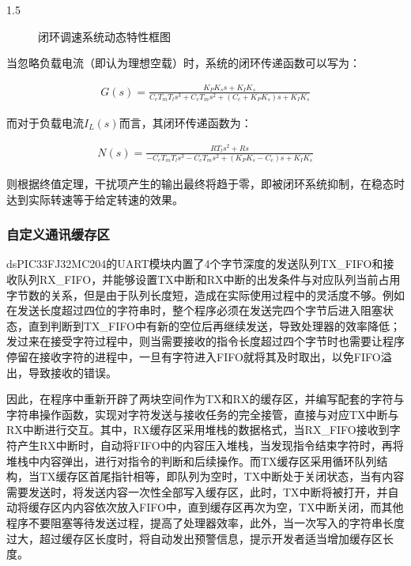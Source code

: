 \documentclass[a4paper,11pt]{ctexart}
\newcommand{\dsp}{dsPIC33FJ32MC204}
\newenvironment{shrinkeq}[2]
{
	\bgroup
	\addtolength\abovedisplayshortskip{#1}
	\addtolength\abovedisplayskip{#1}
	\addtolength\belowdisplayshortskip{#2}
	\addtolength\belowdisplayskip{#2}
}
{
	\egroup
	\ignorespacesafterend
}
\begin{document}
\begin{spacing}{1.5}
\begin{figure}[h]
	\caption{闭环调速系统动态特性框图}\label{figure:闭环调速系统特性框图}
\end{figure}

\par
当忽略负载电流（即认为理想空载）时，系统的闭环传递函数可以写为：
\begin{shrinkeq}{-1ex}{-1ex}
	\begin{align}
	G\left(s\right) = \frac{K_PK_ss+K_IK_s}{C_eT_mT_ls^3+C_eT_ms^2+\left(C_e+K_PK_s\right)s+K_IK_s}
	\end{align}
\end{shrinkeq}
而对于负载电流$I_L\left(s\right)$而言，其闭环传递函数为：
\begin{shrinkeq}{-1ex}{-1ex}
	\begin{align}
	N\left(s\right) = \frac{RT_ls^2+Rs}{-C_eT_mT_ls^3-C_eT_ms^2+\left(K_PK_s-C_e\right)s+K_IK_s}
	\end{align}
\end{shrinkeq}
则根据终值定理，干扰项产生的输出最终将趋于零，即被闭环系统抑制，在稳态时达到实际转速等于给定转速的效果。
\subsubsection{自定义通讯缓存区}
\par
\dsp 的UART模块内置了4个字节深度的发送队列TX\_FIFO和接收队列RX\_FIFO，并能够设置TX中断和RX中断的出发条件与对应队列当前占用字节数的关系，但是由于队列长度短，造成在实际使用过程中的灵活度不够。例如在发送长度超过四位的字符串时，整个程序必须在发送完四个字节后进入阻塞状态，直到判断到TX\_FIFO中有新的空位后再继续发送，导致处理器的效率降低；发过来在接受字符过程中，则当需要接收的指令长度超过四个字节时也需要让程序停留在接收字符的进程中，一旦有字符进入FIFO就将其及时取出，以免FIFO溢出，导致接收的错误。
\par
因此，在程序中重新开辟了两块空间作为TX和RX的缓存区，并编写配套的字符与字符串操作函数，实现对字符发送与接收任务的完全接管，直接与对应TX中断与RX中断进行交互。其中，RX缓存区采用堆栈的数据格式，当RX\_FIFO接收到字符产生RX中断时，自动将FIFO中的内容压入堆栈，当发现指令结束字符时，再将堆栈中内容弹出，进行对指令的判断和后续操作。而TX缓存区采用循环队列结构，当TX缓存区首尾指针相等，即队列为空时，TX中断处于关闭状态，当有内容需要发送时，将发送内容一次性全部写入缓存区，此时，TX中断将被打开，并自动将缓存区内内容依次放入FIFO中，直到缓存区再次为空，TX中断关闭，而其他程序不要阻塞等待发送过程，提高了处理器效率，此外，当一次写入的字符串长度过大，超过缓存区长度时，将自动发出预警信息，提示开发者适当增加缓存区长度。


\end{spacing}
\end{document}
